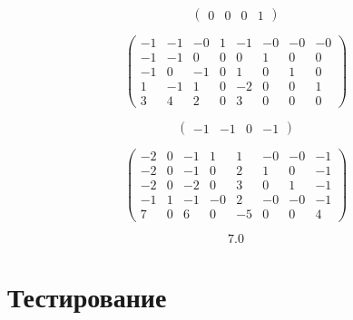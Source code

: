 \documentclass{article}
\begin{document}
$$\begin{pmatrix}
        0 & 0 & 0 & 1
    \end{pmatrix}$$

$$\begin{pmatrix}
        -1 & -1 & -0 & 1 & -1 & -0 & -0 & -0 \\
        -1 & -1 & 0  & 0 & 0  & 1  & 0  & 0  \\
        -1 & 0  & -1 & 0 & 1  & 0  & 1  & 0  \\
        1  & -1 & 1  & 0 & -2 & 0  & 0  & 1  \\
        3  & 4  & 2  & 0 & 3  & 0  & 0  & 0
    \end{pmatrix}$$

$$\begin{pmatrix}
        -1 & -1 & 0 & -1
    \end{pmatrix}
$$

$$\begin{pmatrix}
        -2 & 0 & -1 & 1  & 1  & -0 & -0 & -1 \\
        -2 & 0 & -1 & 0  & 2  & 1  & 0  & -1 \\
        -2 & 0 & -2 & 0  & 3  & 0  & 1  & -1 \\
        -1 & 1 & -1 & -0 & 2  & -0 & -0 & -1 \\
        7  & 0 & 6  & 0  & -5 & 0  & 0  & 4
    \end{pmatrix}$$

$$7.0$$

\section{Тестирование}
\end{document}
